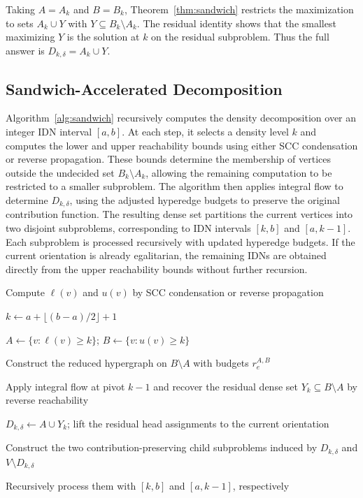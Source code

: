 \documentclass[twocolumn]{svjour3}
\newcommand{\kw}[1]{{\ensuremath{\mathsf{#1}}}\xspace}
\begin{document}
Taking $A=A_k$ and $B=B_k$, Theorem~\ref{thm:sandwich} restricts the maximization to sets $A_k\cup Y$ with $Y\subseteq B_k\setminus A_k$. The residual identity shows that the smallest maximizing $Y$ is the solution at $k$ on the residual subproblem. Thus the full answer is $D_{k,\delta}=A_k\cup Y$.

\subsection{Sandwich-Accelerated Decomposition}
Algorithm~\ref{alg:sandwich} recursively computes the density decomposition over an integer IDN interval $[a,b]$. At each step, it selects a density level $k$ and computes the lower and upper reachability bounds using either SCC condensation or reverse propagation. These bounds determine the membership of vertices outside the undecided set $B_k\setminus A_k$, allowing the remaining computation to be restricted to a smaller subproblem. The algorithm then applies integral flow to determine $D_{k,\delta}$, using the adjusted hyperedge budgets to preserve the original contribution function. The resulting dense set partitions the current vertices into two disjoint subproblems, corresponding to IDN intervals $[k,b]$ and $[a,k-1]$. Each subproblem is processed recursively with updated hyperedge budgets. If the current orientation is already egalitarian, the remaining IDNs are obtained directly from the upper reachability bounds without further recursion.

\begin{algorithm}[t]
\small
\caption{$\kw{Sandwich}(\mathcal H,\delta,[a,b])$}
\label{alg:sandwich}


Compute $\ell(v)$ and $u(v)$ by SCC condensation
or reverse propagation\;


$k\gets a+\lfloor(b-a)/2\rfloor+1$\;

$A\gets\{v:\ell(v)\ge k\}$;
$B\gets\{v:u(v)\ge k\}$\;

Construct the reduced hypergraph on $B\setminus A$
with budgets $r_e^{A,B}$\;

Apply integral flow at pivot $k-1$ and recover the residual
dense set $Y_k\subseteq B\setminus A$ by reverse reachability\;

$D_{k,\delta}\gets A\cup Y_k$; lift the residual head assignments
to the current orientation\;

Construct the two contribution-preserving child subproblems induced by
$D_{k,\delta}$ and $V\setminus D_{k,\delta}$\;

Recursively process them with $[k,b]$ and $[a,k-1]$, respectively\;

\;
\end{algorithm}
\end{document}

